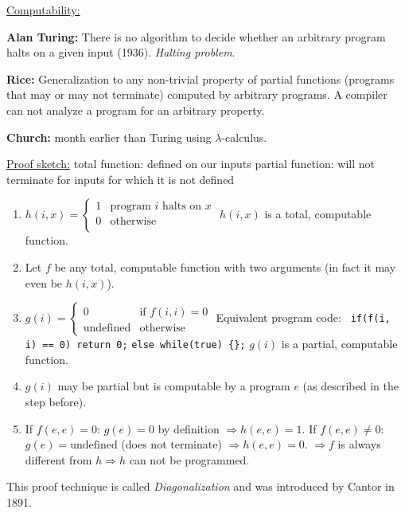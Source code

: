 \par{
	\noindent\underline{Computability:}
	\par{
		\noindent
		\textbf{Alan Turing:} \newline
		There is no algorithm to decide whether an arbitrary program halts on a given input (1936). \textit{Halting problem}.
	}
	\par{
		\noindent
		\textbf{Rice:} \newline
		Generalization to any non-trivial property of partial functions (programs that may or may not terminate) computed by arbitrary programs. A compiler can not analyze a program for an arbitrary property.
	}
	\par{
		\noindent
		\textbf{Church:}  month earlier than Turing using $\lambda$-calculus.
	}
}

\par{
	\noindent\underline{Proof sketch:} \newline
	\indent total function: defined on our inputs \newline
	\indent partial function: will not terminate for inputs for which it is not defined
	\begin{enumerate}
		\item{
			$h(i, x) = \begin{cases}
				1 	&	\text{program } i \text{ halts on } x	\\
				0 	&	\text{otherwise}					\\
			\end{cases}$ \newline
			$h(i, x)$ is a total, computable function.
		}
		\item{Let $f$ be any total, computable function with two arguments (in fact it may even be $h(i, x)$).}
		\item{
			$g(i) = \begin{cases}
				0 					&	\text{if } f(i, i) = 0 	\\
				\text{undefined}	&	\text{otherwise}
			\end{cases}$ \newline\newline
			Equivalent program code: \newline
			\texttt{   if(f(i, i) == 0) return 0;} \newline
			\texttt{else while(true) \{\};} \newline\newline
			$g(i)$ is a partial, computable function.
		}
		\item{$g(i)$ may be partial but is computable by a program $e$ (as described in the step before).}
		\item{
			If $f(e, e) = 0$: $g(e) = 0$ by definition $\Rightarrow h(e, e) = 1$. \newline
			If $f(e, e) \not= 0$: $g(e) = \text{undefined}$ (does not terminate) $\Rightarrow h(e, e) = 0$. \newline
			$\Rightarrow f$ is always different from $h \Rightarrow h$ can not be programmed.
		}
	\end{enumerate}
	This proof technique is called \textit{Diagonalization} and was introduced by Cantor in 1891.
}


